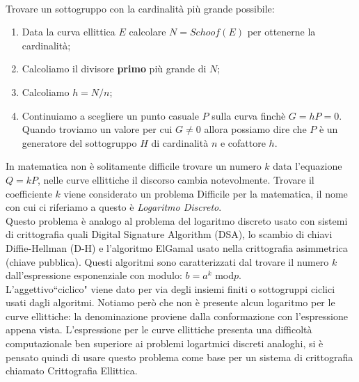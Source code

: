 \documentclass[a4paper,12pt]{tesiinfo}
\begin{document}
\\
Trovare un sottogruppo con la cardinalit\`a pi\`u grande possibile:
\begin{enumerate}
    \item Data la curva ellittica $E$ calcolare $N = Schoof(E)$ per ottenerne la cardinalit\`a;
    \item Calcoliamo il divisore \textbf{primo} pi\`u grande di $N$;
    \item Calcoliamo $h = N \big / n$;
    \item Continuiamo a scegliere un punto casuale $P$ sulla curva finch\`e $G = hP = 0$. Quando troviamo un valore per cui $G \ne 0$ allora possiamo dire che $P$ \`e un generatore del sottogruppo $H$ di cardinalit\`a $n$ e cofattore $h$.
\end{enumerate}
In matematica non \`e solitamente difficile trovare un numero $k$ data l'equazione $Q = kP$, nelle curve ellittiche il discorso cambia notevolmente. Trovare il coefficiente $k$ viene considerato un problema Difficile per la matematica, il nome con cui ci riferiamo a questo \`e \textit{Logaritmo Discreto}.
\\
Questo problema \`e analogo al problema del logaritmo discreto usato con sistemi di crittografia quali Digital Signature Algorithm (DSA), lo scambio di chiavi Diffie-Hellman (D-H) e l'algoritmo ElGamal usato nella crittografia asimmetrica (chiave pubblica). Questi algoritmi sono caratterizzati dal trovare il numero $k$ dall'espressione esponenziale con modulo: $b = a^k$ mod$p$. 
\\
L'aggettivo``ciclico" viene dato per via degli insiemi finiti o sottogruppi ciclici usati dagli algoritmi. Notiamo per\`o che non \`e presente alcun logaritmo per le curve ellittiche: la denominazione proviene dalla conformazione con l'espressione appena vista. L'espressione per le curve ellittiche presenta una difficolt\`a computazionale ben superiore ai problemi logartmici discreti analoghi, si \`e pensato quindi di usare questo problema come base per un sistema di crittografia chiamato Crittografia Ellittica.
%
%
%
%
%
\end{document}
